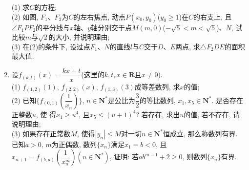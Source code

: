\documentclass[10pt,a4paper]{article}
\begin{document}
\begin{enumerate}[1.]
\begin{center}
\end{center}
(1) 求$C$的方程;\\
(2) 如图, $F_1$、$F_2$为$C$的左右焦点, 动点$P(x_0,y_0)$($y_0\ge 1$)在$C$的右支上, 且$\angle F_1PF_2$的平分线与$x$轴、$y$轴分别交于点$M(m,0)$($-\sqrt 5<m<\sqrt 5$)、$N$, 试比较$m$与$\sqrt 2$的大小, 并说明理由;\\
(3) 在(2)的条件下, 设过点$F_1$、$N$的直线$l$与$C$交于$D$、$E$两点, 求$\triangle F_2DE$的面积最大值.
\item 设$f_{(k,t)}(x)=\dfrac{kx+t}x$(这里的$k,t,x\in \mathbf{R}$且$x\ne 0$).\\
(1) $f_{(1,2)}(1)$, $f_{(2,2)}(x)$, $f_{(1,3)}(3)$成等差数列, 求$x$的值;\\
(2) 已知$\{f_{(0,1)}(\dfrac 1{x_n})\}$, $n\in \mathbf{N}^*$是公比为$\dfrac 32$的等比数列, $x_1,x_5\in \mathbf{N}^*$. 是否存在正整数$u$, 使
得$x_1\ge u^4$, 且$x_5\le (u+1)^4$? 若存在, 求出$u$的值, 若不存在, 请说明理由;\\
(3) 如果存在正常数$M$, 使得$|y_n|\le M$对一切$n\in \mathbf{N}^*$恒成立, 那么称数列有界. 已知$a>0$, $m$为正偶数, 数列$\{x_n\}$满足$x_1=b<0$, 且$x_{n+1}=f_{(b,a)}(\dfrac 1{x_n^m})(n\in \mathbf{N}^*)$, 证明: 若$ab^{m-1}+2\ge 0$, 则数列$\{x_n\}$有界.



\end{enumerate}
\end{document}
